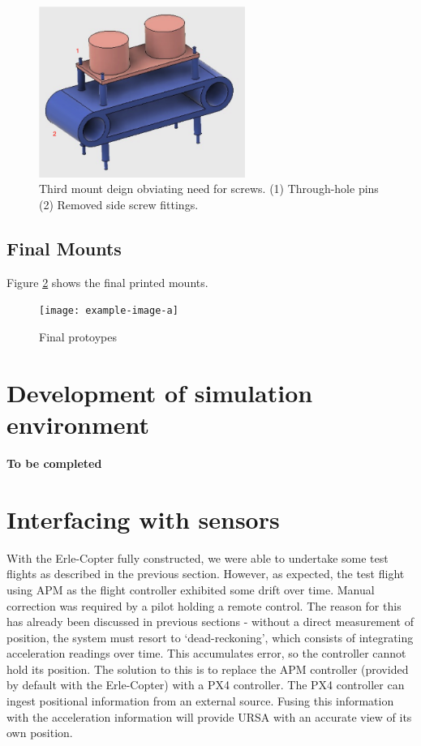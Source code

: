 \documentclass[capstone_report.tex]{subfiles}
\begin{document}
\begin{figure}[H]
    \centering
    \includegraphics[width=0.6\textwidth]{imgs/mount3_labelled.png}
    \caption{Third mount deign obviating need for screws. (1) Through-hole pins (2) Removed side screw fittings. \label{fig:mount3}}
\end{figure}

\subsection{Final Mounts}

Figure \ref{fig:final_mounts} shows the final printed mounts.

\begin{figure}[H]
    \centering
    \texttt{[image: example-image-a]}
    \caption{Final protoypes\label{fig:final_mounts}}
\end{figure}

\section{Development of simulation environment}
\textbf{To be completed}

\section{Interfacing with sensors}
    With the Erle-Copter fully constructed, we were able to undertake some test flights as described in the previous section. However, as expected, the test flight using APM as the flight controller exhibited some drift over time. Manual correction was required by a pilot holding a remote control. The reason for this has already been discussed in previous sections - without a direct measurement of position, the system must resort to `dead-reckoning', which consists of integrating acceleration readings over time. This accumulates error, so the controller cannot hold its position. The solution to this is to replace the APM controller (provided by default with the Erle-Copter) with a PX4 controller. The PX4 controller can ingest positional information from an external source. Fusing this information with the acceleration information will provide URSA with an accurate view of its own position.\\
\end{document}
